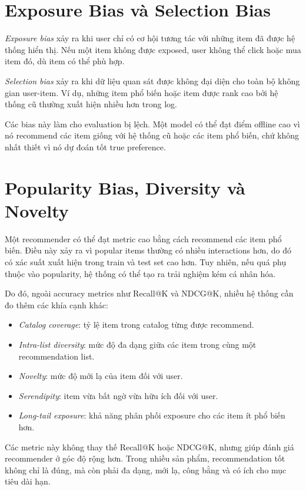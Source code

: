\documentclass[12pt,a4paper]{article}
\begin{document}
\section{Exposure Bias và Selection Bias}

\textit{Exposure bias} xảy ra khi user chỉ có cơ hội tương tác với những item đã được hệ thống hiển thị. Nếu một item không được exposed, user không thể click hoặc mua item đó, dù item có thể phù hợp.

\textit{Selection bias} xảy ra khi dữ liệu quan sát được không đại diện cho toàn bộ không gian user-item. Ví dụ, những item phổ biến hoặc item được rank cao bởi hệ thống cũ thường xuất hiện nhiều hơn trong log.

Các bias này làm cho evaluation bị lệch. Một model có thể đạt điểm offline cao vì nó recommend các item giống với hệ thống cũ hoặc các item phổ biến, chứ không nhất thiết vì nó dự đoán tốt true preference.

\section{Popularity Bias, Diversity và Novelty}

Một recommender có thể đạt metric cao bằng cách recommend các item phổ biến. Điều này xảy ra vì popular items thường có nhiều interactions hơn, do đó có xác suất xuất hiện trong train và test set cao hơn. Tuy nhiên, nếu quá phụ thuộc vào popularity, hệ thống có thể tạo ra trải nghiệm kém cá nhân hóa.

Do đó, ngoài accuracy metrics như Recall@K và NDCG@K, nhiều hệ thống cần đo thêm các khía cạnh khác:

\begin{itemize}[leftmargin=*]
    \item \textit{Catalog coverage}: tỷ lệ item trong catalog từng được recommend.
    \item \textit{Intra-list diversity}: mức độ đa dạng giữa các item trong cùng một recommendation list.
    \item \textit{Novelty}: mức độ mới lạ của item đối với user.
    \item \textit{Serendipity}: item vừa bất ngờ vừa hữu ích đối với user.
    \item \textit{Long-tail exposure}: khả năng phân phối exposure cho các item ít phổ biến hơn.
\end{itemize}

Các metric này không thay thế Recall@K hoặc NDCG@K, nhưng giúp đánh giá recommender ở góc độ rộng hơn. Trong nhiều sản phẩm, recommendation tốt không chỉ là đúng, mà còn phải đa dạng, mới lạ, công bằng và có ích cho mục tiêu dài hạn.
\end{document}
